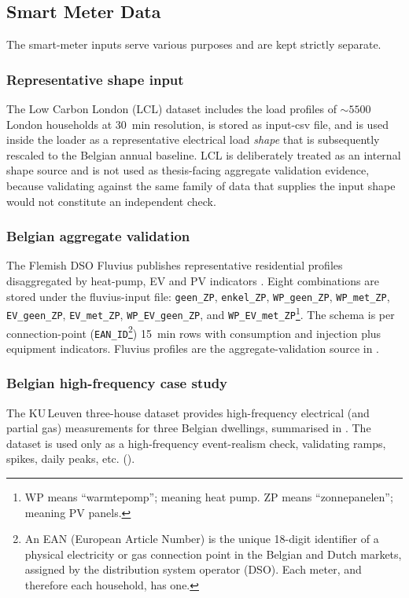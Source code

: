 \subsection{Smart Meter Data}
\label{sec:smartMeterData}

The smart-meter inputs serve various purposes and are kept
strictly separate.
 
\subsubsection*{Representative shape input} 
The Low Carbon London (LCL) dataset \cite{LowCarbonLondon2014} includes the load profiles of ${\sim}5500$ London households at \SI{30}{min} resolution, is stored as input-csv file, and is used inside the loader as a representative electrical load \emph{shape} that is subsequently rescaled to the Belgian annual baseline. LCL is deliberately treated as an internal shape source and is not used as thesis-facing aggregate validation evidence, because validating against the same family of data that supplies the input shape would not constitute an independent check.
 
\subsubsection*{Belgian aggregate validation} 
The Flemish DSO Fluvius publishes representative residential profiles disaggregated by heat-pump, EV and PV indicators \cite{Fluvius2024OpenData}. Eight combinations are stored under the fluvius-input file: \texttt{geen\_ZP}, \texttt{enkel\_ZP}, \texttt{WP\_geen\_ZP}, \texttt{WP\_met\_ZP}, \texttt{EV\_geen\_ZP}, \texttt{EV\_met\_ZP}, \texttt{WP\_EV\_geen\_ZP}, and \texttt{WP\_EV\_met\_ZP}\footnote{WP means ``warmtepomp''; meaning heat pump. ZP means ``zonnepanelen''; meaning PV panels.}. The schema is per connection-point (\texttt{EAN\_ID}\footnote{An EAN (European Article Number) is the unique 18-digit identifier of a physical electricity or gas connection point in the Belgian and Dutch markets, assigned by the distribution system operator (DSO). Each meter, and therefore each household, has one.}) \SI{15}{min} rows with consumption and injection plus equipment indicators. Fluvius profiles are the aggregate-validation source in .
 
\subsubsection*{Belgian high-frequency case study} 
The KU\,Leuven three-house dataset \cite{KULeuven3House} provides high-frequency electrical (and partial gas) measurements for three Belgian dwellings, summarised in . The dataset is used only as a high-frequency event-realism check, validating ramps, spikes, daily peaks, etc. ().

